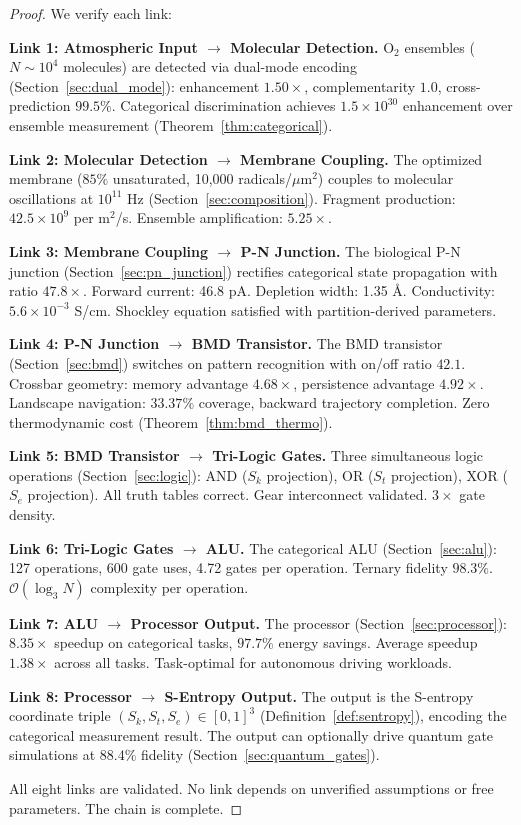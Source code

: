 \documentclass[twocolumn,10pt,a4paper]{article}
\theoremstyle{definition}
\theoremstyle{remark}
\newcommand{\Sk}{S_k}
\newcommand{\St}{S_t}
\newcommand{\Se}{S_e}
\begin{document}
\begin{proof}
We verify each link:

\medskip
\noindent\textbf{Link 1: Atmospheric Input $\to$ Molecular Detection.}
O$_2$ ensembles ($N \sim 10^4$ molecules) are detected via dual-mode encoding (Section~\ref{sec:dual_mode}): enhancement $1.50\times$, complementarity $1.0$, cross-prediction $99.5\%$. Categorical discrimination achieves $1.5 \times 10^{30}$ enhancement over ensemble measurement (Theorem~\ref{thm:categorical}). \checkmark

\medskip
\noindent\textbf{Link 2: Molecular Detection $\to$ Membrane Coupling.}
The optimized membrane ($85\%$ unsaturated, 10,000 radicals/$\mu$m$^2$) couples to molecular oscillations at $10^{11}$ Hz (Section~\ref{sec:composition}). Fragment production: $42.5 \times 10^9$ per m$^2$/s. Ensemble amplification: $5.25\times$. \checkmark

\medskip
\noindent\textbf{Link 3: Membrane Coupling $\to$ P-N Junction.}
The biological P-N junction (Section~\ref{sec:pn_junction}) rectifies categorical state propagation with ratio $47.8\times$. Forward current: 46.8 pA. Depletion width: 1.35 \AA. Conductivity: $5.6 \times 10^{-3}$ S/cm. Shockley equation satisfied with partition-derived parameters. \checkmark

\medskip
\noindent\textbf{Link 4: P-N Junction $\to$ BMD Transistor.}
The BMD transistor (Section~\ref{sec:bmd}) switches on pattern recognition with on/off ratio $42.1$. Crossbar geometry: memory advantage $4.68\times$, persistence advantage $4.92\times$. Landscape navigation: $33.37\%$ coverage, backward trajectory completion. Zero thermodynamic cost (Theorem~\ref{thm:bmd_thermo}). \checkmark

\medskip
\noindent\textbf{Link 5: BMD Transistor $\to$ Tri-Logic Gates.}
Three simultaneous logic operations (Section~\ref{sec:logic}): AND ($\Sk$ projection), OR ($\St$ projection), XOR ($\Se$ projection). All truth tables correct. Gear interconnect validated. $3\times$ gate density. \checkmark

\medskip
\noindent\textbf{Link 6: Tri-Logic Gates $\to$ ALU.}
The categorical ALU (Section~\ref{sec:alu}): 127 operations, 600 gate uses, 4.72 gates per operation. Ternary fidelity $98.3\%$. $\mathcal{O}(\log_3 N)$ complexity per operation. \checkmark

\medskip
\noindent\textbf{Link 7: ALU $\to$ Processor Output.}
The processor (Section~\ref{sec:processor}): $8.35\times$ speedup on categorical tasks, $97.7\%$ energy savings. Average speedup $1.38\times$ across all tasks. Task-optimal for autonomous driving workloads. \checkmark

\medskip
\noindent\textbf{Link 8: Processor $\to$ S-Entropy Output.}
The output is the S-entropy coordinate triple $(\Sk, \St, \Se) \in [0,1]^3$ (Definition~\ref{def:sentropy}), encoding the categorical measurement result. The output can optionally drive quantum gate simulations at $88.4\%$ fidelity (Section~\ref{sec:quantum_gates}). \checkmark

\medskip
All eight links are validated. No link depends on unverified assumptions or free parameters. The chain is complete. \qedhere
\end{proof}
\end{document}
